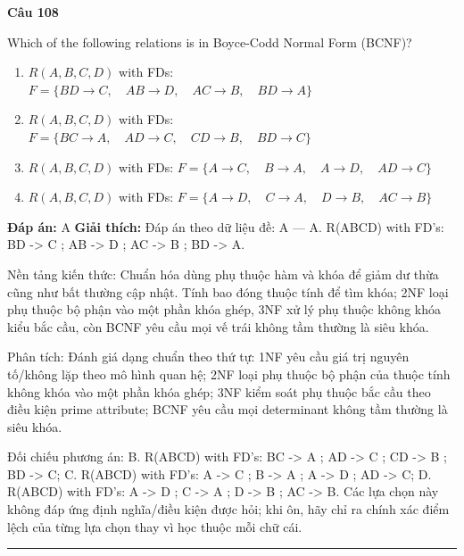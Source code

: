 \documentclass[11pt,a4paper]{article}
\newenvironment{question}[1]{%
  \par\vspace{1em}\noindent\textbf{\large Câu #1}\par\vspace{0.4em}
}{%
  \par\vspace{1em}\hrule\vspace{0.6em}
}
\newenvironment{choices}{%
  \begin{enumerate}[label=\textbf{\Alph*.},leftmargin=2.2em,itemsep=2pt,topsep=3pt]
}{%
  \end{enumerate}
}
\newcommand{\choice}{\item}
\begin{document}
\begin{question}{108}
Which of the following relations is in Boyce-Codd Normal Form (BCNF)?
\begin{choices}
\choice \(R(A, B, C, D)\) with FDs: \(F = \{ BD \rightarrow C, \quad AB \rightarrow D, \quad AC \rightarrow B, \quad BD \rightarrow A \}\)
\choice \(R(A, B, C, D)\) with FDs: \(F = \{ BC \rightarrow A, \quad AD \rightarrow C, \quad CD \rightarrow B, \quad BD \rightarrow C \}\)
\choice \(R(A, B, C, D)\) with FDs: \(F = \{ A \rightarrow C, \quad B \rightarrow A, \quad A \rightarrow D, \quad AD \rightarrow C \}\)
\choice \(R(A, B, C, D)\) with FDs: \(F = \{ A \rightarrow D, \quad C \rightarrow A, \quad D \rightarrow B, \quad AC \rightarrow B \}\)
\end{choices}
\textbf{Đáp án:} A
\textbf{Giải thích:} Đáp án theo dữ liệu đề: A — A. R(ABCD) with FD's: BD -> C ; AB -> D ; AC -> B ; BD -> A.

Nền tảng kiến thức: Chuẩn hóa dùng phụ thuộc hàm và khóa để giảm dư thừa cũng như bất thường cập nhật. Tính bao đóng thuộc tính để tìm khóa; 2NF loại phụ thuộc bộ phận vào một phần khóa ghép, 3NF xử lý phụ thuộc không khóa kiểu bắc cầu, còn BCNF yêu cầu mọi vế trái không tầm thường là siêu khóa.

Phân tích: Đánh giá dạng chuẩn theo thứ tự: 1NF yêu cầu giá trị nguyên tố/không lặp theo mô hình quan hệ; 2NF loại phụ thuộc bộ phận của thuộc tính không khóa vào một phần khóa ghép; 3NF kiểm soát phụ thuộc bắc cầu theo điều kiện prime attribute; BCNF yêu cầu mọi determinant không tầm thường là siêu khóa.

Đối chiếu phương án: B. R(ABCD) with FD's: BC -> A ; AD -> C ; CD -> B ; BD -> C; C. R(ABCD) with FD's: A -> C ; B -> A ; A -> D ; AD -> C; D. R(ABCD) with FD's: A -> D ; C -> A ; D -> B ; AC -> B. Các lựa chọn này không đáp ứng định nghĩa/điều kiện được hỏi; khi ôn, hãy chỉ ra chính xác điểm lệch của từng lựa chọn thay vì học thuộc mỗi chữ cái.
\end{question}
\end{document}
